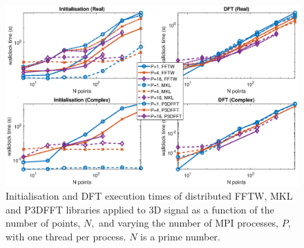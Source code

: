 \documentclass[a4paper]{article}
\begin{document}
\begin{figure}[htb]
    \centering
    \includegraphics[width=0.9\linewidth]{../results/fftw_mkl_p3dfft_prime_3d_mpi.eps}
  \caption{Initialisation and DFT execution times of distributed FFTW, MKL and P3DFFT libraries applied to 3D signal as a function of the
    number of points, $N,$ and varying the number of MPI processes, $P,$ with one thread per process. $N$ is a prime number.}
  \label{3DDistFFTWMKLP3DFFTprime}
\end{figure}
\end{document}
